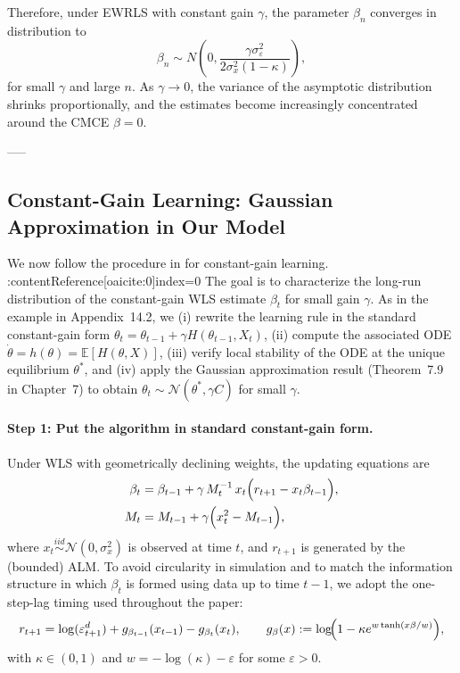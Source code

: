 \documentclass[11pt]{article}
\begin{document}
Therefore, under EWRLS with constant gain $\gamma$, the parameter $\beta_n$ converges in distribution to
\begin{equation}
    \beta_n \sim N\left(0, \frac{\gamma \sigma^2_\varepsilon}{2\sigma^2_x(1-\kappa)}\right),
\end{equation}
for small $\gamma$ and large $n$. As $\gamma \to 0$, the variance of the asymptotic distribution shrinks proportionally, and the estimates become increasingly concentrated around the CMCE $\beta = 0$.

-----

\subsection{Constant-Gain Learning: Gaussian Approximation in Our Model}\label{app:cg_proof_style}

We now follow the procedure in \citet{GeorgeWEvans2001} for constant-gain learning. :contentReference[oaicite:0]{index=0}
The goal is to characterize the long-run distribution of the constant-gain WLS estimate $\beta_t$ for small gain $\gamma$.
As in the example in Appendix~14.2, we (i) rewrite the learning rule in the standard constant-gain form
$\theta_t=\theta_{t-1}+\gamma H(\theta_{t-1},X_t)$, (ii) compute the associated ODE
$\dot\theta=h(\theta)=\mathbb E[H(\theta,X)]$, (iii) verify local stability of the ODE at the unique equilibrium
$\theta^*$, and (iv) apply the Gaussian approximation result (Theorem~7.9 in Chapter~7) to obtain
$\theta_t\sim\mathcal N(\theta^*,\gamma C)$ for small $\gamma$.

\paragraph{Step 1: Put the algorithm in standard constant-gain form.}
Under WLS with geometrically declining weights, the updating equations are
\begin{align}
    \beta_t &= \beta_{t-1} + \gamma\, M_t^{-1}\, x_t\Bigl(r_{t+1}-x_t\beta_{t-1}\Bigr), \label{eq:cg_beta_app}\\
    M_t &= M_{t-1} + \gamma\Bigl(x_t^2-M_{t-1}\Bigr), \label{eq:cg_M_app}
\end{align}
where $x_t\stackrel{iid}{\sim}\mathcal N(0,\sigma_x^2)$ is observed at time $t$, and $r_{t+1}$ is generated by the (bounded) ALM.
To avoid circularity in simulation and to match the information structure in which $\beta_t$ is formed using data up to time $t-1$, we adopt the one-step-lag timing used throughout the paper:
\begin{equation}\label{eq:cg_alm_app}
    r_{t+1}
    =
    \log(\varepsilon^d_{t+1})
    + g_{\beta_{t-1}}(x_{t-1})
    - g_{\beta_t}(x_t),
    \qquad
    g_{\beta}(x):=\log\!\Bigl(1-\kappa e^{w\tanh(x\beta/w)}\Bigr),
\end{equation}
with $\kappa\in(0,1)$ and $w=-\log(\kappa)-\varepsilon$ for some $\varepsilon>0$.
\end{document}

